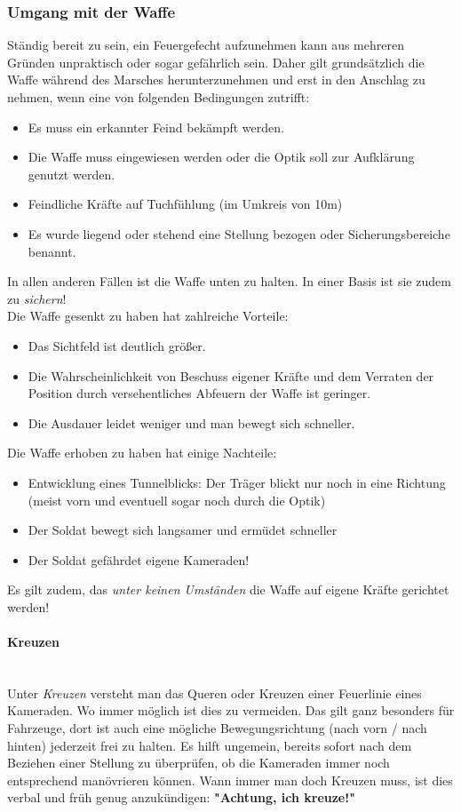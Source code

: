 \subsubsection{Umgang mit der Waffe}

Ständig bereit zu sein, ein Feuergefecht aufzunehmen kann aus mehreren Gründen unpraktisch oder sogar gefährlich sein. Daher gilt grundsätzlich die Waffe während des Marsches herunterzunehmen und erst in den Anschlag zu nehmen, wenn eine von folgenden Bedingungen zutrifft:
	\begin{itemize}
		\item Es muss ein erkannter Feind bekämpft werden.
		\item Die Waffe muss eingewiesen werden oder die Optik soll zur Aufklärung genutzt werden.
		\item Feindliche Kräfte auf Tuchfühlung (im Umkreis von 10m)
		\item Es wurde liegend oder stehend eine Stellung bezogen oder Sicherungsbereiche benannt.
	\end{itemize}

In allen anderen Fällen ist die Waffe unten zu halten. In einer Basis ist sie zudem zu \textit{sichern}! \\

Die Waffe gesenkt zu haben hat zahlreiche Vorteile:
	\begin{itemize}
		\item Das Sichtfeld ist deutlich größer.
		\item Die Wahrscheinlichkeit von Beschuss eigener Kräfte und dem Verraten der Position durch versehentliches Abfeuern der Waffe ist geringer.
		\item Die Ausdauer leidet weniger und man bewegt sich schneller.
	\end{itemize}
Die Waffe erhoben zu haben hat einige Nachteile:
	\begin{itemize}
		\item Entwicklung eines Tunnelblicks: Der Träger blickt nur noch in eine Richtung (meist vorn und eventuell sogar noch durch die Optik)
		\item Der Soldat bewegt sich langsamer und ermüdet schneller
		\item Der Soldat gefährdet eigene Kameraden!
	\end{itemize}
Es gilt zudem, das \textit{unter keinen Umständen} die Waffe auf eigene Kräfte gerichtet werden!

\paragraph{Kreuzen}$\ $\\
	Unter \textit{Kreuzen} versteht man das Queren oder Kreuzen einer Feuerlinie eines Kameraden. Wo immer möglich ist dies zu vermeiden. Das gilt ganz besonders für Fahrzeuge, dort ist auch eine mögliche Bewegungsrichtung (nach vorn / nach hinten) jederzeit frei zu halten. Es hilft ungemein, bereits sofort nach dem Beziehen einer Stellung zu überprüfen, ob die Kameraden immer noch entsprechend manövrieren können. Wann immer man doch Kreuzen muss, ist dies verbal und früh genug anzukündigen: \textbf{"Achtung, ich kreuze!"}

